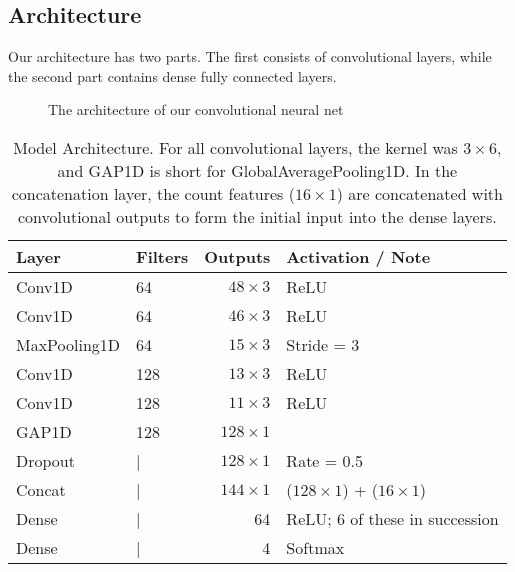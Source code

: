 \subsection{Architecture}
Our architecture has two parts.
The first consists of convolutional layers, while the second part contains dense fully connected layers.


\begin{figure*}[!h]
  \vspace{-0.2cm}
  \centering
   {}
  \caption{The architecture of our convolutional neural net}
  \label{fig:ConvNet}
  \vspace{-0.1cm}
\end{figure*}


\begin{table}[!h]
\begin{center}
\begin{tabular}{llrp{2.5cm}}\toprule
Layer 	&  	 	Filters 	& 	Outputs  	&  	Activation \newline / Note\\\midrule
Conv1D  	&  	64 		& 	$48 \times 3$	&  ReLU \\
Conv1D  & 	64 		&	$46 \times 3 $ 	& ReLU  \\
MaxPooling1D  &  64 		& 	$15 \times 3$	& Stride = 3\\
Conv1D & 		128 	& 	$13 \times 3$&  ReLU\\
Conv1D & 128 & $11 \times 3$ & ReLU\\
GAP1D & 128 & $128 \times 1$ & \\
Dropout & | &  $128 \times 1$ & Rate = 0.5\\
Concat  & | & $144 \times 1$&  ($128 \times 1$) \newline + ($16 \times 1$)\\
Dense & | & 64 & ReLU; 6 of these in succession \\
Dense & | & 4 & Softmax

\end{tabular}
\caption{Model Architecture. For all convolutional layers, the kernel was $3 \times 6$, and GAP1D is short for GlobalAveragePooling1D. In the concatenation layer, the count features ($16 \times 1$) are concatenated with convolutional outputs to form the initial input into the dense layers.}
\label{tab:ArchDescription}
\end{center}
\end{table}

